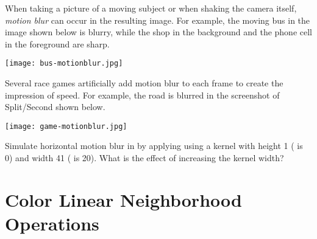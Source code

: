 \documentclass{book}
\begin{document}
\begin{exercise} When taking a picture of a moving subject or when shaking the camera itself, \emph{motion blur} can occur in the resulting image. For example, the moving bus in the image shown below is blurry, while the shop in the background and the phone cell in the foreground are sharp.
\begin{center}
\texttt{[image: bus-motionblur.jpg]}
\end{center}
Several race games artificially add motion blur to each frame to create the impression of speed. For example, the road is blurred in the screenshot of Split/Second shown below.  
\begin{center}
\texttt{[image: game-motionblur.jpg]}
\end{center}


Simulate horizontal motion blur in  by applying  using a kernel with height 1 ( is 0) and width 41 ( is 20). What is the effect of increasing the kernel width?
\end{exercise}

\section{Color Linear Neighborhood Operations}

\end{document}
